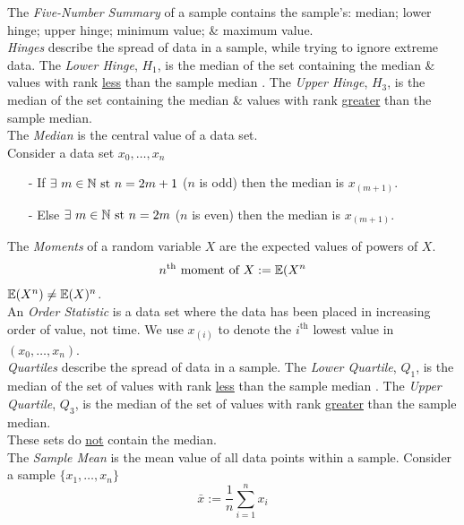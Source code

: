 \documentclass[11pt,a4paper]{article}
\begin{document}
The \textit{Five-Number Summary} of a sample contains the sample's: median; lower hinge; upper hinge; minimum value; \& maximum value.\\

\textit{Hinges} describe the spread of data in a sample, while trying to ignore extreme data. The \textit{Lower Hinge}, $H_1$, is the median of the set containing the median \& values with rank \underline{less} than the sample median . The \textit{Upper Hinge}, $H_3$, is the median of the set containing the median \& values with rank \underline{greater} than the sample median.\\

The \textit{Median} is the central value of a data set.\\
Consider a data set $x_0,\dots,x_n$
\begin{itemize}
	\item[-] If $\exists\ m\in\mathbb{N}\text{ st } n=2m+1$ (\ie $n$ is odd) then the median is $x_{(m+1)}$.
	\item[-] Else $\exists\ m\in\mathbb{N}\text{ st } n=2m$ (\ie $n$ is even) then the median is $x_{(m+1)}$.
\end{itemize}

The \textit{Moments} of a random variable $X$ are the expected values of powers of $X$.
$$n^{\text{th}}\text{ moment of }X:=\mathbb{E}(X^n$$
\nb $\mathbb{E}(X^n)\neq\mathbb{E}(X)^n$.\\

An \textit{Order Statistic} is a data set where the data has been placed in increasing order of value, not time. We use $x_{(i)}$ to denote the $i^\text{th}$ lowest value in $(x_0,\dots,x_n)$.\\

\textit{Quartiles} describe the spread of data in a sample.  The \textit{Lower Quartile}, $Q_1$, is the median of the set of values with rank \underline{less} than the sample median . The \textit{Upper Quartile}, $Q_3$, is the median of the set of values with rank \underline{greater} than the sample median.\\
\nb These sets do \underline{not} contain the median.\\

The \textit{Sample Mean} is the mean value of all data points within a sample. Consider a sample $\{x_1,\dots,x_n\}$
$$\bar{x}:=\frac{1}{n}\sum_{i=1}^nx_i$$
\end{document}
